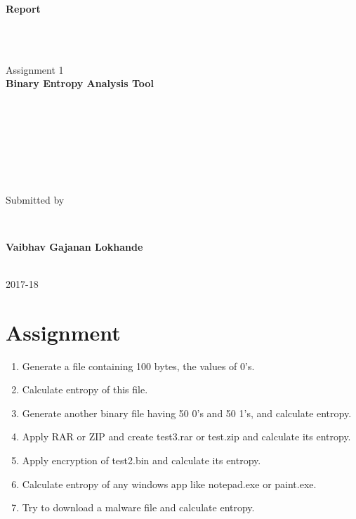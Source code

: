 \documentclass[oneside,a4paper,12pt]{report}
\author{Vaibhav Lokhande}
\begin{document}
	\begin{center}
	
		\begin{huge}
			\textbf{Report}
		\end{huge}

		\ \\
		\ \\
		\begin{large}
			Assignment 1
			\ \\
			\textbf{Binary Entropy Analysis Tool}		
		\end{large}		
		\ \\ 
		\ \\
		\ \\
		\ \\ 
		\ \\
		\ \\
		\begin{large}
		Submitted by
		\end{large}
		\ \\
		\begin{normalsize}
		\textbf{Vaibhav Gajanan Lokhande}
		\end{normalsize}
		\ \\
		2017-18
	\end{center}
\newpage 
\pagestyle{fancy}
\newcommand{\changefont}{%
    \fontsize{8}{10}\selectfont
}
\fancyhf{}
\fancyhead[LE,RO]{\changefont \rightmark} %
\fancyfoot[C]{\changefont \thepage} %

\tableofcontents
\newpage
\chapter{Assignment}
\begin{enumerate}
\item Generate a file  containing 100 bytes, the values of 0's.
\item Calculate entropy of this file.
\item Generate another binary file having 50 0's and 50 1's, and calculate entropy.
\item Apply RAR or ZIP and create test3.rar or test.zip and calculate its entropy.
\item Apply encryption of test2.bin and calculate its entropy.
\item Calculate entropy of any windows app like notepad.exe or paint.exe.
\item Try to download a malware file and calculate entropy.
\end{enumerate}
\end{document}
